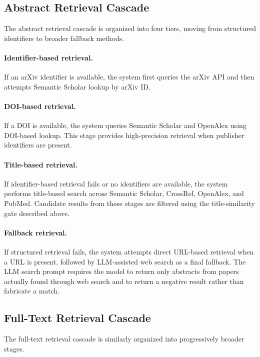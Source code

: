 \documentclass{article}
\theoremstyle{plain}
\theoremstyle{definition}
\theoremstyle{remark}
\begin{document}
\subsection{Abstract Retrieval Cascade}
\label{app:abstract_cascade_details}

The abstract retrieval cascade is organized into four tiers, moving from structured identifiers to broader fallback methods.

\paragraph{Identifier-based retrieval.}
If an arXiv identifier is available, the system first queries the arXiv API and then attempts Semantic Scholar lookup by arXiv ID.

\paragraph{DOI-based retrieval.}
If a DOI is available, the system queries Semantic Scholar and OpenAlex using DOI-based lookup. This stage provides high-precision retrieval when publisher identifiers are present.

\paragraph{Title-based retrieval.}
If identifier-based retrieval fails or no identifiers are available, the system performs title-based search across Semantic Scholar, CrossRef, OpenAlex, and PubMed. Candidate results from these stages are filtered using the title-similarity gate described above.

\paragraph{Fallback retrieval.}
If structured retrieval fails, the system attempts direct URL-based retrieval when a URL is present, followed by LLM-assisted web search as a final fallback. The LLM search prompt requires the model to return only abstracts from papers actually found through web search and to return a negative result rather than fabricate a match.

\subsection{Full-Text Retrieval Cascade}
\label{app:fulltext_cascade_details}

The full-text retrieval cascade is similarly organized into progressively broader stages.
\end{document}
